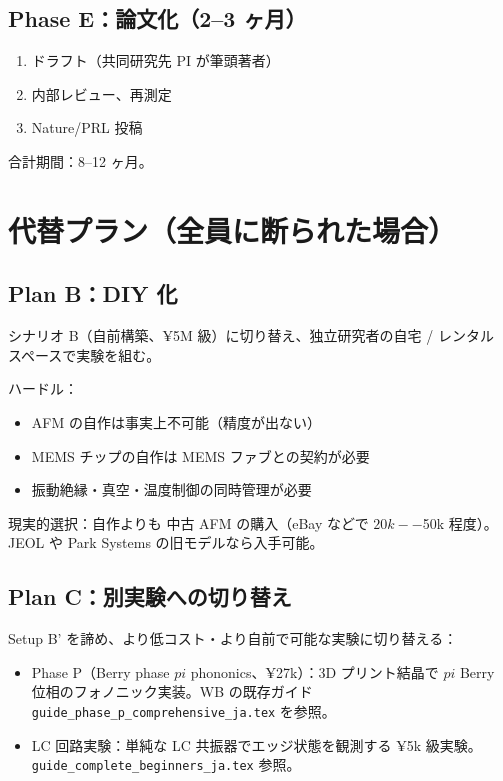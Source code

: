 \documentclass[11pt,a4paper]{article}
\def\pi{pi}%
\def\textbf#1{#1}%
\begin{document}
\subsection{Phase E：論文化（2--3 ヶ月）}

\begin{enumerate}
\item ドラフト（共同研究先 PI が筆頭著者）
\item 内部レビュー、再測定
\item Nature/PRL 投稿
\end{enumerate}

\textbf{合計期間：8--12 ヶ月}。

\newpage

\section{代替プラン（全員に断られた場合）}

\subsection{Plan B：DIY 化}

シナリオ B（自前構築、¥5M 級）に切り替え、独立研究者の自宅 / レンタル
スペースで実験を組む。

\textbf{ハードル}：
\begin{itemize}
\item AFM の自作は事実上不可能（精度が出ない）
\item MEMS チップの自作は MEMS ファブとの契約が必要
\item 振動絶縁・真空・温度制御の同時管理が必要
\end{itemize}

\textbf{現実的選択}：自作よりも \textbf{中古 AFM の購入}（eBay などで $20k--$50k 程度）。
JEOL や Park Systems の旧モデルなら入手可能。

\subsection{Plan C：別実験への切り替え}

Setup B' を諦め、より低コスト・より自前で可能な実験に切り替える：

\begin{itemize}
\item \textbf{Phase P}（Berry phase $\pi$ phononics、¥27k）：3D プリント結晶で
  $\pi$ Berry 位相のフォノニック実装。WB の既存ガイド
  \texttt{guide\_phase\_p\_comprehensive\_ja.tex} を参照。
\item \textbf{LC 回路実験}：単純な LC 共振器でエッジ状態を観測する
  ¥5k 級実験。\texttt{guide\_complete\_beginners\_ja.tex} 参照。
\end{itemize}
\end{document}

